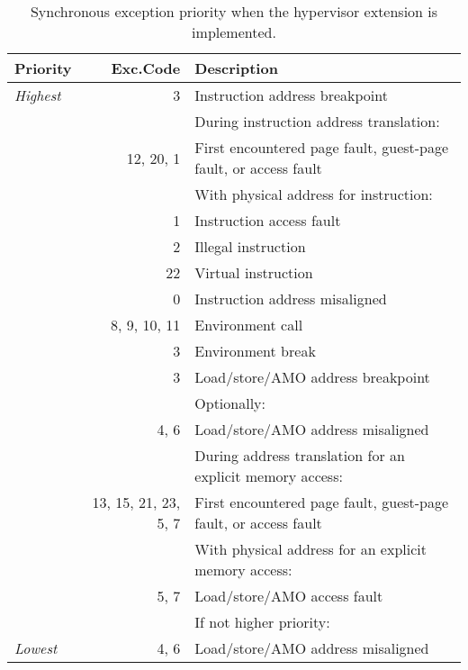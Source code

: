 \begin{table*}[htbp]
\begin{center}
\begin{tabular}{|l|r|l|}
  \hline
  Priority      & Exc.\@ Code  & Description \\
  \hline
  {\em Highest} &            3 & Instruction address breakpoint \\
  \hline
                &              & During instruction address translation: \\
                &    12, 20, 1 & \quad First encountered page fault,
                                   guest-page fault, or access fault \\
  \hline
                &              & With physical address for instruction: \\
                &            1 & \quad Instruction access fault \\
  \hline
                &            2 & Illegal instruction \\
                &           22 & Virtual instruction \\
                &            0 & Instruction address misaligned \\
                & 8, 9, 10, 11 & Environment call \\
                &            3 & Environment break \\
                &            3 & Load/store/AMO address breakpoint \\
  \hline
                &              & Optionally: \\
                &         4, 6 & \quad Load/store/AMO address misaligned \\
  \hline
                &              & During address translation for an explicit
                                   memory access: \\
        & 13, 15, 21, 23, 5, 7 & \quad First encountered page fault,
                                   guest-page fault, or access fault \\
  \hline
                &              & With physical address for an explicit
                                   memory access: \\
                &         5, 7 & \quad Load/store/AMO access fault \\
  \hline
                &              & If not higher priority: \\
  {\em Lowest}  &         4, 6 & \quad Load/store/AMO address misaligned \\
  \hline
\end{tabular}
\end{center}
\caption{%
Synchronous exception priority when the hypervisor extension is
implemented.%
}
\label{tab:HSyncExcPrio}
\end{table*}


